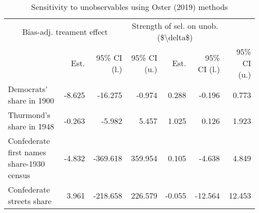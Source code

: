 \begin{table}[h]

\caption{\label{tab:oster_2019}Sensitivity to unobservables using Oster (2019) methods}
\centering
\begin{tabular}[t]{lrrrrrr}
\toprule
\multicolumn{3}{c}{Bias-adj. treament effect} & \multicolumn{3}{c}{Strength of sel. on unob. (\$\textbackslash{}delta\$)} \\
\cmidrule(l{3pt}r{3pt}){1-3} \cmidrule(l{3pt}r{3pt}){4-6}
  & Est.  & 95\% CI (l.) & 95\% CI (u.) & Est. & 95\% CI (l.)  & 95\% CI (u.) \\
\midrule
Democrats' share in 1900 & -8.625 & -16.275 & -0.974 & 0.288 & -0.196 & 0.773\\
Thurmond's share in 1948 & -0.263 & -5.982 & 5.457 & 1.025 & 0.126 & 1.923\\
Confederate first names share-1930 census & -4.832 & -369.618 & 359.954 & 0.105 & -4.638 & 4.849\\
Confederate streets share & 3.961 & -218.658 & 226.579 & -0.055 & -12.564 & 12.453\\
\bottomrule
\end{tabular}
\end{table}
